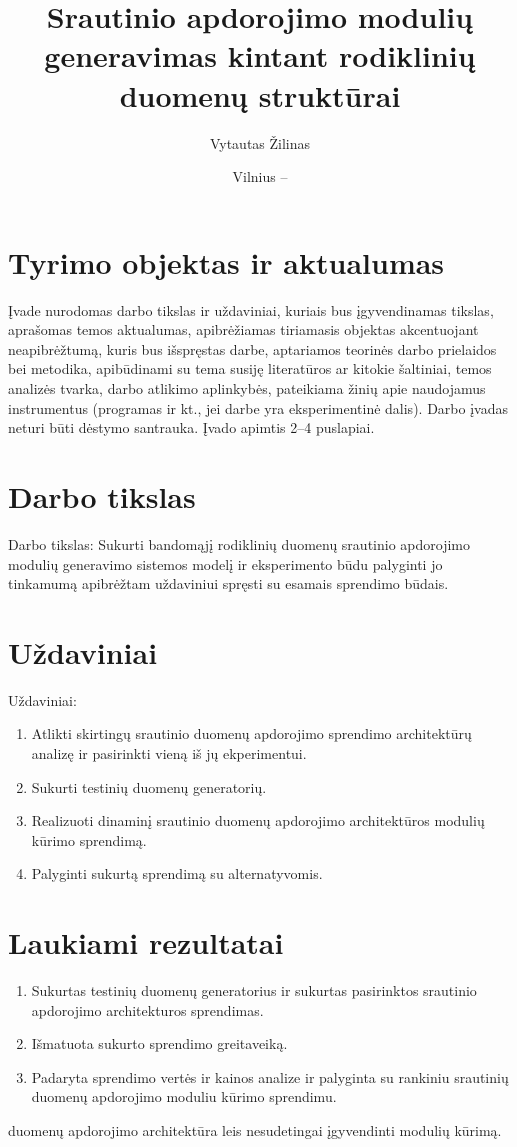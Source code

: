 \documentclass{VUMIFPSbakalaurinis}
\title{Srautinio apdorojimo modulių generavimas kintant rodiklinių duomenų struktūrai}
\author{Vytautas Žilinas}
\date{Vilnius – \the\year}
\begin{document}
 
\maketitle

\cleardoublepage{}
\setcounter{page}{2}


\section{Tyrimo objektas ir aktualumas}
Įvade nurodomas darbo tikslas ir uždaviniai, kuriais bus įgyvendinamas tikslas,
aprašomas temos aktualumas, apibrėžiamas tiriamasis objektas akcentuojant
neapibrėžtumą, kuris bus išspręstas darbe, aptariamos teorinės darbo prielaidos
bei metodika, apibūdinami su tema susiję literatūros ar kitokie šaltiniai,
temos analizės tvarka, darbo atlikimo aplinkybės, pateikiama žinių apie
naudojamus instrumentus (programas ir kt., jei darbe yra eksperimentinė dalis).
Darbo įvadas neturi būti dėstymo santrauka. Įvado apimtis 2–4 puslapiai.

\section{Darbo tikslas}
Darbo tikslas: Sukurti bandomąjį rodiklinių duomenų srautinio apdorojimo modulių 
generavimo sistemos modelį ir eksperimento būdu palyginti jo tinkamumą apibrėžtam 
uždaviniui spręsti su esamais sprendimo būdais.

\section{Uždaviniai}
Uždaviniai:
\begin{enumerate}
  \item Atlikti skirtingų srautinio duomenų apdorojimo sprendimo architektūrų analizę ir pasirinkti vieną iš jų ekperimentui.
  \item Sukurti testinių duomenų generatorių.
  \item Realizuoti dinaminį srautinio duomenų apdorojimo architektūros modulių kūrimo sprendimą.
	\item Palyginti sukurtą sprendimą su alternatyvomis.
\end{enumerate}

\section{Laukiami rezultatai}
    \begin{enumerate}
        \item Sukurtas testinių duomenų generatorius ir sukurtas pasirinktos srautinio apdorojimo architekturos sprendimas.
        \item Išmatuota sukurto sprendimo greitaveiką.
        \item Padaryta sprendimo vertės ir kainos analize ir palyginta su rankiniu srautinių duomenų apdorojimo moduliu kūrimo sprendimu. 
    \end{enumerate}
    \vspace{1 mm}
duomenų apdorojimo architektūra leis nesudetingai įgyvendinti modulių kūrimą.
\end{document}
